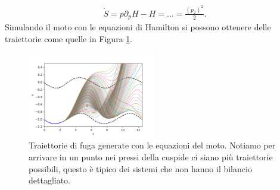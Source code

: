 \begin{exmp}[]
    \[\begin{aligned}
	\dot{S} = p\partial_{p}H-H=\ldots=\frac{(p_2)^2}{2}
    .\end{aligned}\]
    Simulando il moto con le equazioni di Hamilton si possono ottenere delle traiettorie come quelle in Figura \ref{fig:figures-lez_12_strange_motion-png}.
    \begin{figure}[H]
        \centering
	\includegraphics[width=0.5\textwidth]{figures/lez_12_strange_motion.png}
	\caption{\scriptsize Traiettorie di fuga generate con le equazioni del moto. Notiamo per arrivare in un punto nei pressi della cuspide ci siano più traiettorie possibili, questo è tipico dei sistemi che non hanno il bilancio dettagliato.}
        \label{fig:figures-lez_12_strange_motion-png}
    \end{figure}
\end{exmp}
\noindent


